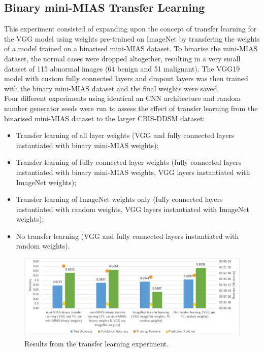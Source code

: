 
\subsection{Binary mini-MIAS Transfer Learning}

This experiment consisted of expanding upon the concept of transfer learning for the VGG model using weights pre-trained on ImageNet by transfering the weights of a model trained on a binarised mini-MIAS dataset. To binarise the mini-MIAS dataset, the normal cases were dropped altogether, resulting in a very small dataset of 115 abnormal images (64 benign and 51 malignant). The VGG19 model with custom fully connected layers and dropout layers was then trained with the binary mini-MIAS dataset and the final weights were saved.\\

Four different experiments using identical an CNN architecture and random number generator seeds were run to assess the effect of transfer learning from the binarised mini-MIAS dataset to the larger CBIS-DDSM dataset:
\begin{itemize}
    \item Transfer learning of all layer weights (VGG and fully connected layers instantiated with binary mini-MIAS weights);
    \item Transfer learning of fully connected layer weights (fully connected layers instantiated with binary mini-MIAS weights, VGG layers instantiated with ImageNet weights);
    \item Transfer learning of ImageNet weights only (fully connected layers instantiated with random weights, VGG layers instantiated with ImageNet weights);
    \item No transfer learning (VGG and fully connected layers instantiated with random weights).
\end{itemize}

\begin{figure}[ht]
\centerline{\includegraphics[width=\textwidth]{figures/evaluation/individual/transfer_learning_results.png}}
\caption{\label{fig:evaluation-individual-transfer_learning_results}Results from the transfer learning experiment.}
\end{figure}

